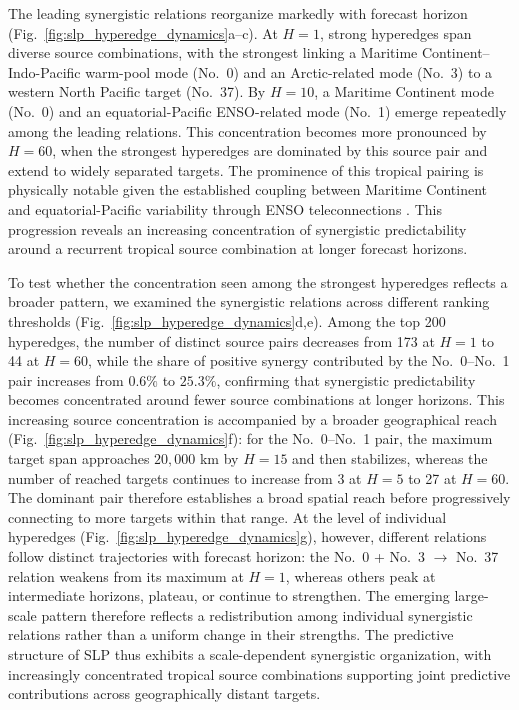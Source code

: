 \documentclass[fleqn,10pt]{wlscirep}
\begin{document}
The leading synergistic relations reorganize markedly with forecast horizon
(Fig.~\ref{fig:slp_hyperedge_dynamics}a--c). At $H=1$, strong hyperedges
span diverse source combinations, with the strongest linking a Maritime
Continent--Indo-Pacific warm-pool mode (No.~0) and an Arctic-related mode
(No.~3) to a western North Pacific target (No.~37). By $H=10$, a Maritime
Continent mode (No.~0) and an equatorial-Pacific ENSO-related mode (No.~1)
emerge repeatedly among the leading relations. This concentration becomes
more pronounced by $H=60$, when the strongest hyperedges are dominated by
this source pair and extend to widely separated targets. The prominence of
this tropical pairing is physically notable given the established coupling
between Maritime Continent and equatorial-Pacific variability through ENSO teleconnections
\cite{Chen2023ENSOMaritimeContinent}. This progression
reveals an increasing concentration of synergistic predictability around a
recurrent tropical source combination at longer forecast horizons.

To test whether the concentration seen among the strongest hyperedges reflects
a broader pattern, we examined the synergistic relations across different
ranking thresholds (Fig.~\ref{fig:slp_hyperedge_dynamics}d,e). Among the
top 200 hyperedges, the number of distinct source pairs decreases from 173
at $H=1$ to 44 at $H=60$, while the share of positive synergy contributed
by the No.~0--No.~1 pair increases from $0.6\%$ to $25.3\%$, confirming
that synergistic predictability becomes concentrated around fewer source
combinations at longer horizons. This increasing source concentration is
accompanied by a broader geographical reach
(Fig.~\ref{fig:slp_hyperedge_dynamics}f): for the No.~0--No.~1 pair, the
maximum target span approaches $20{,}000$ km by $H=15$ and then stabilizes,
whereas the number of reached targets continues to increase from 3 at $H=5$
to 27 at $H=60$. The dominant pair therefore establishes a broad spatial
reach before progressively connecting to more targets within that range.
At the level of individual hyperedges
(Fig.~\ref{fig:slp_hyperedge_dynamics}g), however, different relations
follow distinct trajectories with forecast horizon: the
No.~0 + No.~3 $\rightarrow$ No.~37 relation weakens from its maximum at
$H=1$, whereas others peak at intermediate horizons, plateau, or continue
to strengthen. The emerging large-scale pattern therefore reflects a
redistribution among individual synergistic relations rather than a uniform
change in their strengths. The predictive structure of SLP thus exhibits a scale-dependent
synergistic organization, with increasingly concentrated tropical source
combinations supporting joint predictive contributions across geographically
distant targets.
\end{document}
